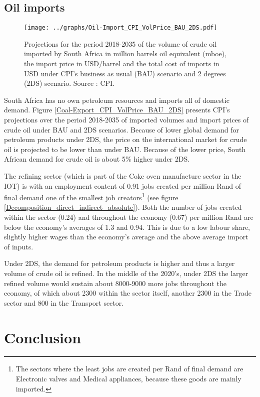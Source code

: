 \documentclass[12pt,english]{article}
\begin{document}
\subsection{Oil imports}

\begin{figure}[!t]
	\centering
	\texttt{[image: ../graphs/Oil-Import\_CPI\_VolPrice\_BAU\_2DS.pdf]}
	\caption{\label{Oil-Import_CPI_VolPrice_BAU_2DS}\small Projections for the period 2018-2035 of the volume of crude oil imported by South Africa in million barrels oil equivalent (mboe), the import price in USD/barrel and the total cost of imports in USD under CPI's business as usual (BAU) scenario and 2 degrees (2DS) scenario. Source : CPI.}
\end{figure}

South Africa has no own petroleum resources and imports all of domestic demand. Figure \ref{Coal-Export_CPI_VolPrice_BAU_2DS} presents CPI's projections over the period 2018-2035 of imported volumes and import prices of crude oil under BAU and 2DS scenarios. Because of lower global demand for petroleum products under 2DS, the price on the international market for crude oil is projected to be lower than under BAU. Because of the lower price, South African demand for crude oil is about 5\% higher under 2DS. 

The refining sector (which is part of the Coke oven manufacture sector in the IOT) is with an employment content of 0.91 jobs created per million Rand of final demand one of the smallest job creators\footnote{The sectors where the least jobs are created per Rand of final demand are Electronic valves and Medical appliances, because these goods are mainly imported.} (see figure \ref{Decomposition_direct_indirect_absolute}). Both the number of jobs created within the sector (0.24) and throughout the economy (0.67) per million Rand are below the economy's averages of 1.3 and 0.94. This is due to a low labour share, slightly higher wages than the economy's average and the above average import of inputs. 

Under 2DS, the demand for petroleum products is higher and thus a larger volume of crude oil is refined. In the middle of the 2020's, under 2DS the larger refined volume would sustain about 8000-9000 more jobs throughout the economy, of which about 2300 within the sector itself, another 2300 in the Trade sector and 800 in the Transport sector.



\section{Conclusion} \label{conclusion}
\end{document}
